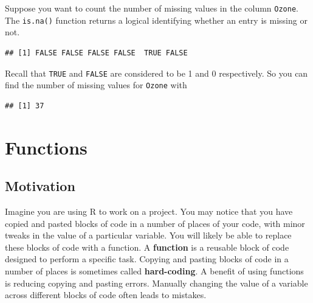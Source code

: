 \documentclass[
]{book}
\newenvironment{Shaded}{\begin{snugshade}}{\end{snugshade}}
\newcommand{\DocumentationTok}[1]{\textcolor[rgb]{0.56,0.35,0.01}{\textbf{\textit{#1}}}}
\newcommand{\FunctionTok}[1]{\textcolor[rgb]{0.13,0.29,0.53}{\textbf{#1}}}
\newcommand{\NormalTok}[1]{#1}
\newcommand{\SpecialCharTok}[1]{\textcolor[rgb]{0.81,0.36,0.00}{\textbf{#1}}}
\theoremstyle{definition}
\theoremstyle{definition}
\theoremstyle{definition}
\theoremstyle{definition}
\theoremstyle{remark}
\begin{document}
Suppose you want to count the number of missing values in the column \texttt{Ozone}. The \texttt{is.na()} function returns a logical identifying whether an entry is missing or not.

\begin{Shaded}
\end{Shaded}

\begin{verbatim}
## [1] FALSE FALSE FALSE FALSE  TRUE FALSE
\end{verbatim}

Recall that \texttt{TRUE} and \texttt{FALSE} are considered to be 1 and 0 respectively. So you can find the number of missing values for \texttt{Ozone} with

\begin{Shaded}
\end{Shaded}

\begin{verbatim}
## [1] 37
\end{verbatim}

\hypertarget{func}{%
\chapter{Functions}\label{func}}

\hypertarget{motivation-1}{%
\section{Motivation}\label{motivation-1}}

Imagine you are using R to work on a project. You may notice that you have copied and pasted blocks of code in a number of places of your code, with minor tweaks in the value of a particular variable. You will likely be able to replace these blocks of code with a function. A \textbf{function} is a reusable block of code designed to perform a specific task. Copying and pasting blocks of code in a number of places is sometimes called \textbf{hard-coding}. A benefit of using functions is reducing copying and pasting errors. Manually changing the value of a variable across different blocks of code often leads to mistakes.
\end{document}

